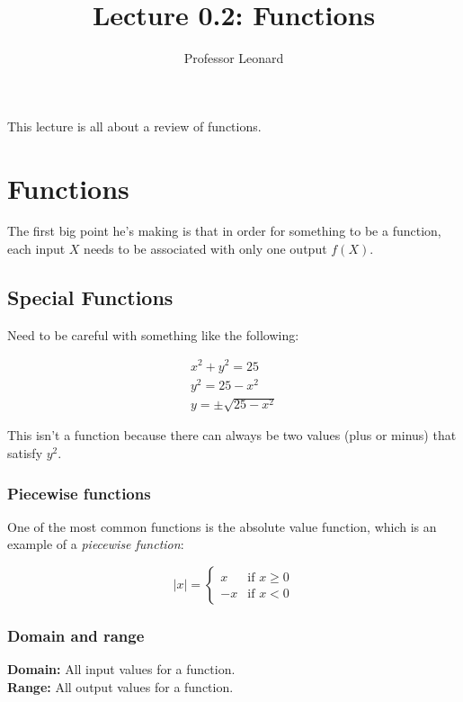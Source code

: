 \documentclass{article}
\begin{document}
\title{Lecture 0.2: Functions}
\author{Professor Leonard}
\maketitle

This lecture is all about a review of functions.


\section{Functions}
The first big point he's making is that in order for something to be a function, each
input $X$ needs to be associated with only one output $f(X)$.

\subsection{Special Functions}

Need to be careful with something like the following:

\begin{align}
    x^2 + y^2 = 25\\
    y^2 = 25 - x^2\\
    y = \pm \sqrt{25 - x^2}
\end{align}

This isn't a function because there can always be two values (plus or minus) that satisfy
$y^2$.\\

\subsubsection{Piecewise functions}

One of the most common functions is the absolute value function, which is an example of a
\emph{piecewise function}:

\begin{equation}
    \lvert x \rvert = 
    \begin{cases}
        x & \text{if } x \geq 0\\
        -x & \text{if } x < 0
    \end{cases}
\end{equation}

\subsubsection{Domain and range}

\textbf{Domain:} All input values for a function.\\ 
\textbf{Range:} All output values for a function.\\
\end{document}
